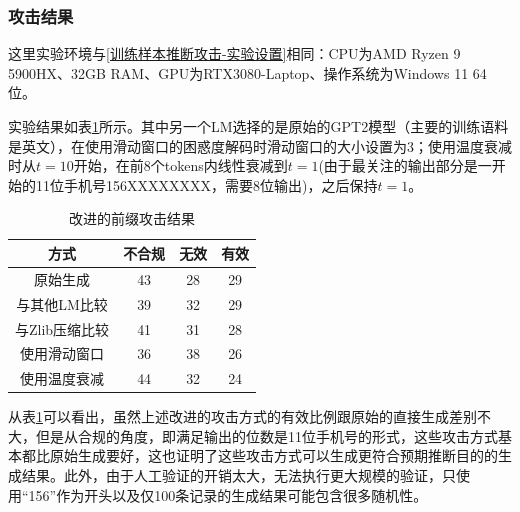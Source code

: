 \subsubsection{攻击结果} \label{Chap3_meminfer_setting}

这里实验环境与\ref{训练样本推断攻击-实验设置}相同：CPU为AMD Ryzen 9 5900HX、32GB RAM、GPU为RTX3080-Laptop、操作系统为Windows 11 64位。

实验结果如表\ref{Remaster_Attack_Method_with_Num_Success}所示。其中另一个LM选择的是原始的GPT2模型\cite{GPT2}（主要的训练语料是英文），在使用滑动窗口的困惑度解码时滑动窗口的大小设置为3；使用温度衰减时从$t=10$开始，在前8个tokens内线性衰减到$t=1$(由于最关注的输出部分是一开始的11位手机号156XXXXXXXX，需要8位输出)，之后保持$t=1$。

\begin{table}[]
	\centering
	\caption{改进的前缀攻击结果}
	\begin{tabular}{|c|c|c|c|}
		\hline
		方式&不合规&无效&有效   \\ \hline
		原始生成&43&28&29    \\ \hline
		与其他LM比较&39&32&29    \\ \hline
		与Zlib压缩比较&41&31&28    \\ \hline
		使用滑动窗口&36&38&26    \\ \hline
		使用温度衰减&44&32&24    \\ \hline
	\end{tabular}
	\label{Remaster_Attack_Method_with_Num_Success}
\end{table}


从表\ref{Remaster_Attack_Method_with_Num_Success}可以看出，虽然上述改进的攻击方式的有效比例跟原始的直接生成差别不大，但是从合规的角度，即满足输出的位数是11位手机号的形式，这些攻击方式基本都比原始生成要好，这也证明了这些攻击方式可以生成更符合预期推断目的的生成结果。此外，由于人工验证的开销太大，无法执行更大规模的验证，只使用“156”作为开头以及仅100条记录的生成结果可能包含很多随机性。


